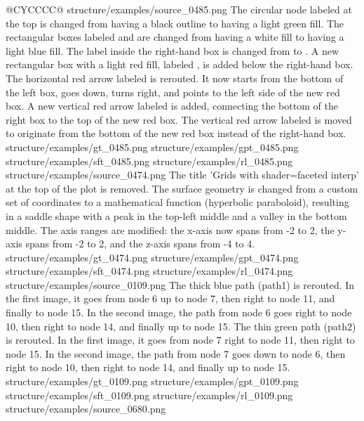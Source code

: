 \begin{table}[t]
\begin{tabularx}{\textwidth}{@{}CYCCCC@{}}
    \exrowone
      {structure/examples/source_0485.png}
      {The circular node labeled \smath{\psi} at the top is changed from having a black outline to having a light green fill. The rectangular boxes labeled  and  are changed from having a white fill to having a light blue fill. The label inside the right-hand box is changed from  to . A new rectangular box with a light red fill, labeled , is added below the right-hand box. The horizontal red arrow labeled  is rerouted. It now starts from the bottom of the left box, goes down, turns right, and points to the left side of the new red box. A new vertical red arrow labeled  is added, connecting the bottom of the right box to the top of the new red box. The vertical red arrow labeled \smath{\lambda} is moved to originate from the bottom of the new red box instead of the right-hand box.}
      {structure/examples/gt_0485.png}
      {structure/examples/gpt_0485.png}
      {structure/examples/sft_0485.png}
      {structure/examples/rl_0485.png}
    \midrule
    \exrowtwo
      {structure/examples/source_0474.png}
      {The title 'Grids with shader=faceted interp' at the top of the plot is removed. The surface geometry is changed from a custom set of coordinates to a mathematical function (hyperbolic paraboloid), resulting in a saddle shape with a peak in the top-left middle and a valley in the bottom middle. The axis ranges are modified: the x-axis now spans from -2 to 2, the y-axis spans from -2 to 2, and the z-axis spans from -4 to 4.}
      {structure/examples/gt_0474.png}
      {structure/examples/gpt_0474.png}
      {structure/examples/sft_0474.png}
      {structure/examples/rl_0474.png}
    \midrule
    \exrowthree
      {structure/examples/source_0109.png}
      {The thick blue path (path1) is rerouted. In the first image, it goes from node 6 up to node 7, then right to node 11, and finally to node 15. In the second image, the path from node 6 goes right to node 10, then right to node 14, and finally up to node 15. The thin green path (path2) is rerouted. In the first image, it goes from node 7 right to node 11, then right to node 15. In the second image, the path from node 7 goes down to node 6, then right to node 10, then right to node 14, and finally up to node 15.}
      {structure/examples/gt_0109.png}
      {structure/examples/gpt_0109.png}
      {structure/examples/sft_0109.png}
      {structure/examples/rl_0109.png}
    \midrule
    \exrowfour
      {structure/examples/source_0680.png}

\end{tabularx}
\end{table}
